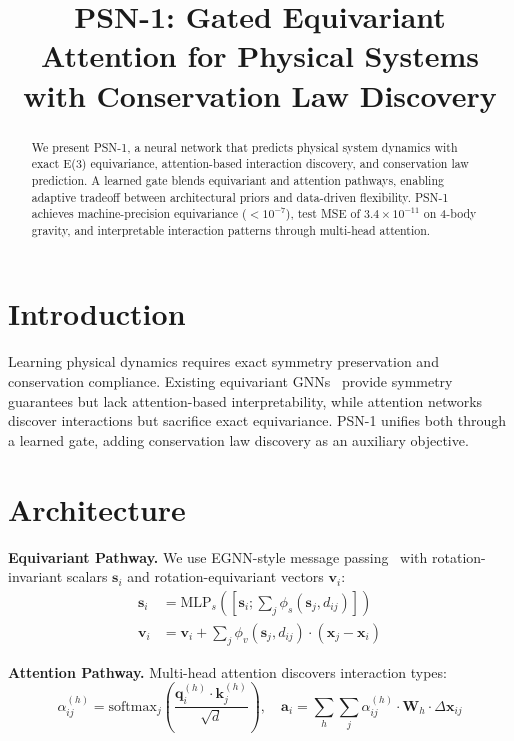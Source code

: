 \documentclass[conference]{IEEEtran}
\title{PSN-1: Gated Equivariant Attention for Physical Systems with Conservation Law Discovery}
\author{
\IEEEauthorblockN{Sehaj Singh}
\IEEEauthorblockA{Independent Research\\ sehajr-singhs@github.com}
}
\begin{document}
\maketitle

\begin{abstract}
We present PSN-1, a neural network that predicts physical system dynamics with exact E(3) equivariance, attention-based interaction discovery, and conservation law prediction. A learned gate blends equivariant and attention pathways, enabling adaptive tradeoff between architectural priors and data-driven flexibility. PSN-1 achieves machine-precision equivariance ($<10^{-7}$), test MSE of $3.4\times10^{-11}$ on 4-body gravity, and interpretable interaction patterns through multi-head attention.
\end{abstract}

\section{Introduction}
Learning physical dynamics requires exact symmetry preservation and conservation compliance. Existing equivariant GNNs~\citep{satorras2021egnn} provide symmetry guarantees but lack attention-based interpretability, while attention networks~\citep{velickovic2018graph} discover interactions but sacrifice exact equivariance. PSN-1 unifies both through a learned gate, adding conservation law discovery as an auxiliary objective.

\section{Architecture}
\textbf{Equivariant Pathway.} We use EGNN-style message passing~\citep{satorras2021egnn} with rotation-invariant scalars $\mathbf{s}_i$ and rotation-equivariant vectors $\mathbf{v}_i$:
\begin{align}
\mathbf{s}_i &= \text{MLP}_s([\mathbf{s}_i; \sum_j \phi_s(\mathbf{s}_j, d_{ij})]) \\
\mathbf{v}_i &= \mathbf{v}_i + \sum_j \phi_v(\mathbf{s}_j, d_{ij}) \cdot (\mathbf{x}_j - \mathbf{x}_i)
\end{align}

\textbf{Attention Pathway.} Multi-head attention discovers interaction types:
\begin{equation}
\alpha_{ij}^{(h)} = \text{softmax}_{j}\left(\frac{\mathbf{q}_i^{(h)} \cdot \mathbf{k}_j^{(h)}}{\sqrt{d}}\right), \quad \mathbf{a}_i = \sum_h \sum_j \alpha_{ij}^{(h)} \cdot \mathbf{W}_h \cdot \Delta\mathbf{x}_{ij}
\end{equation}
\end{document}
